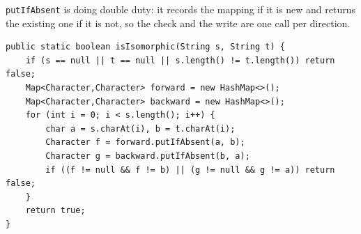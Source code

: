 \texttt{putIfAbsent} is doing double duty: it records the mapping if it is new
and returns the existing one if it is not, so the check and the write are one
call per direction.

\solheading
\begin{lstlisting}[style=java]
public static boolean isIsomorphic(String s, String t) {
    if (s == null || t == null || s.length() != t.length()) return false;
    Map<Character,Character> forward = new HashMap<>();
    Map<Character,Character> backward = new HashMap<>();
    for (int i = 0; i < s.length(); i++) {
        char a = s.charAt(i), b = t.charAt(i);
        Character f = forward.putIfAbsent(a, b);
        Character g = backward.putIfAbsent(b, a);
        if ((f != null && f != b) || (g != null && g != a)) return false;
    }
    return true;
}
\end{lstlisting}

